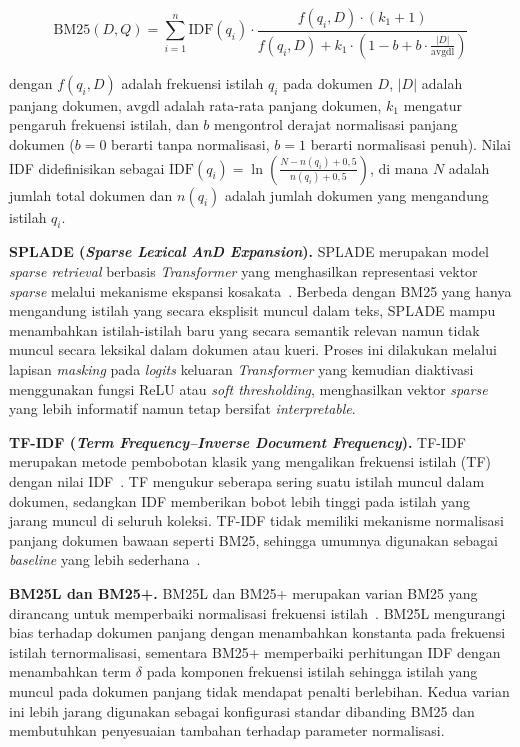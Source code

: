 \begin{equation}
	\text{BM25}(D, Q) = \sum_{i=1}^{n} \text{IDF}(q_i) \cdot \frac{f(q_i, D) \cdot (k_1 + 1)}{f(q_i, D) + k_1 \cdot \left(1 - b + b \cdot \frac{|D|}{\text{avgdl}}\right)}
\end{equation}

dengan $f(q_i, D)$ adalah frekuensi istilah $q_i$ pada dokumen $D$, $|D|$ adalah panjang dokumen, $\text{avgdl}$ adalah rata-rata panjang dokumen, $k_1$ mengatur pengaruh frekuensi istilah, dan $b$ mengontrol derajat normalisasi panjang dokumen ($b = 0$ berarti tanpa normalisasi, $b = 1$ berarti normalisasi penuh). Nilai IDF didefinisikan sebagai $\text{IDF}(q_i) = \ln\left(\frac{N - n(q_i) + 0{,}5}{n(q_i) + 0{,}5}\right)$, di mana $N$ adalah jumlah total dokumen dan $n(q_i)$ adalah jumlah dokumen yang mengandung istilah $q_i$.

\textbf{SPLADE (\textit{Sparse Lexical AnD Expansion}).} SPLADE merupakan model \textit{sparse retrieval} berbasis \textit{Transformer} yang menghasilkan representasi vektor \textit{sparse} melalui mekanisme ekspansi kosakata~\cite{formal2021splade}. Berbeda dengan BM25 yang hanya mengandung istilah yang secara eksplisit muncul dalam teks, SPLADE mampu menambahkan istilah-istilah baru yang secara semantik relevan namun tidak muncul secara leksikal dalam dokumen atau kueri. Proses ini dilakukan melalui lapisan \textit{masking} pada \textit{logits} keluaran \textit{Transformer} yang kemudian diaktivasi menggunakan fungsi ReLU atau \textit{soft thresholding}, menghasilkan vektor \textit{sparse} yang lebih informatif namun tetap bersifat \textit{interpretable}.

\textbf{TF-IDF (\textit{Term Frequency--Inverse Document Frequency}).} TF-IDF merupakan metode pembobotan klasik yang mengalikan frekuensi istilah (TF) dengan nilai IDF~\cite{salton1988term}. TF mengukur seberapa sering suatu istilah muncul dalam dokumen, sedangkan IDF memberikan bobot lebih tinggi pada istilah yang jarang muncul di seluruh koleksi. TF-IDF tidak memiliki mekanisme normalisasi panjang dokumen bawaan seperti BM25, sehingga umumnya digunakan sebagai \textit{baseline} yang lebih sederhana~\cite{robertson2009probabilistic}.

\textbf{BM25L dan BM25+.} BM25L dan BM25+ merupakan varian BM25 yang dirancang untuk memperbaiki normalisasi frekuensi istilah~\cite{lv2011lowerbound}. BM25L mengurangi bias terhadap dokumen panjang dengan menambahkan konstanta pada frekuensi istilah ternormalisasi, sementara BM25+ memperbaiki perhitungan IDF dengan menambahkan term $\delta$ pada komponen frekuensi istilah sehingga istilah yang muncul pada dokumen panjang tidak mendapat penalti berlebihan. Kedua varian ini lebih jarang digunakan sebagai konfigurasi standar dibanding BM25 dan membutuhkan penyesuaian tambahan terhadap parameter normalisasi.

